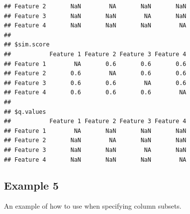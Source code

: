 \documentclass{article}\usepackage[]{graphicx}\usepackage[usenames,dvipsnames]{color}
\newenvironment{knitrout}{}{} %
\begin{document}
\begin{knitrout}
\begin{kframe}
\begin{verbatim}
## Feature 2       NaN        NA       NaN       NaN
## Feature 3       NaN       NaN        NA       NaN
## Feature 4       NaN       NaN       NaN        NA
## 
## $sim.score
##           Feature 1 Feature 2 Feature 3 Feature 4
## Feature 1        NA       0.6       0.6       0.6
## Feature 2       0.6        NA       0.6       0.6
## Feature 3       0.6       0.6        NA       0.6
## Feature 4       0.6       0.6       0.6        NA
## 
## $q.values
##           Feature 1 Feature 2 Feature 3 Feature 4
## Feature 1        NA       NaN       NaN       NaN
## Feature 2       NaN        NA       NaN       NaN
## Feature 3       NaN       NaN        NA       NaN
## Feature 4       NaN       NaN       NaN        NA
\end{verbatim}
\end{kframe}
\end{knitrout}

\subsection{Example 5}

An example of how to use  when specifying column subsets.
\end{document}
